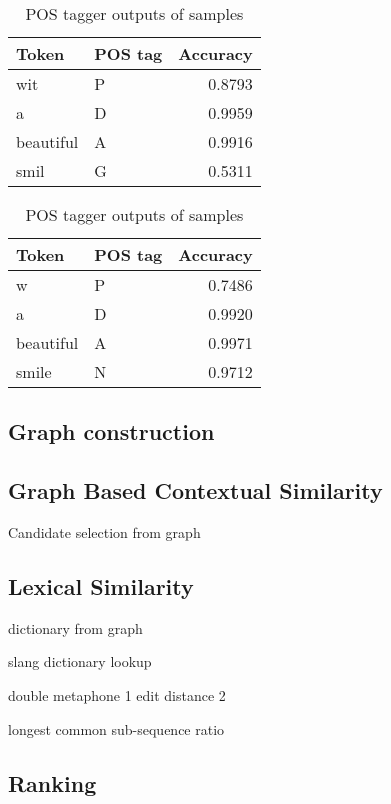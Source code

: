 \begin{table}[!hbp]
\caption{POS tagger outputs of samples}
\label{tab:postags}
\begin{minipage}{.5\linewidth}
\begin{tabular}[h]{|llr|}
 \hline
Token & POS tag & Accuracy \\
 \hline
wit & P & 0.8793 \\
 \hline
a & D & 0.9959 \\
 \hline
beautiful & A & 0.9916 \\
 \hline
smil & G & 0.5311 \\
 \hline
\end{tabular}
\end{minipage}
\begin{minipage}{.5\linewidth}
\begin{tabular}[h]{|llr|}
 \hline
Token & POS tag & Accuracy \\
 \hline
w & P & 0.7486 \\
 \hline
a & D & 0.9920 \\
 \hline
beautiful & A & 0.9971 \\
 \hline
smile & N & 0.9712 \\
 \hline
\end{tabular}
\end{minipage}
\end{table}


\subsection{Graph construction}

\subsection{Graph Based Contextual Similarity}


Candidate selection from graph

\subsection{Lexical Similarity}

dictionary from graph

slang dictionary lookup

double metaphone 1
edit distance 2


longest common sub-sequence ratio



\subsection{Ranking}

